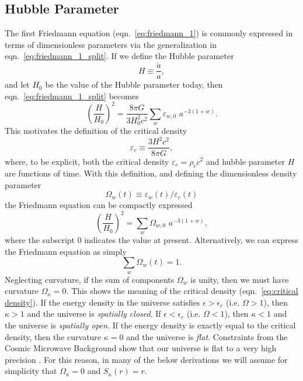 \subsection{Hubble Parameter}
\label{sec:hubble_parameter}
The first Friedmann equation (eqn.~\ref{eq:friedmann_1}) is commonly expressed
in terms of dimensionless parameters via the generalization in
eqn.~\ref{eq:friedmann_1_split}.  If we define the Hubble parameter
\begin{equation}
  \label{eq:hubble_parameter}
  H \equiv \frac{\dot{a}}{a},
\end{equation}
and let $H_0$ be the value of the Hubble parameter today, then
eqn.~\ref{eq:friedmann_1_split} becomes
\begin{equation}
  \left(\frac{H}{H_0}\right)^2 = \frac{8\pi G}{3H_0^2c^2}
  \sum_w \varepsilon_{w, 0} \,\, a^{-3(1 + w)}.
\end{equation}
This motivates the definition of the critical density
\begin{equation}
  \label{eq:critical_density}
  \varepsilon_c \equiv \frac{3 H^2 c^2}{8\pi G},
\end{equation}
where, to be explicit, both the critical density $\varepsilon_c = \rho_c c^2$
and hubble parameter $H$ are functions of time.  With this definition,
and defining the dimensionless density parameter
\begin{equation}
  \label{eq:density_parameter}
  \Omega_w(t) \equiv \varepsilon_w(t) / \varepsilon_c(t)
\end{equation}
the Friedmann equation can be compactly expressed
\begin{equation}
  \left(\frac{H}{H_0}\right)^2
  = \sum_w \Omega_{w, 0}\,\, a^{-3(1 + w)},
\end{equation}
where the subscript $0$ indicates the value at present.
Alternatively, we can express the Friedmann equation as simply
\begin{equation}
  \sum_w \Omega_w(t) = 1.
\end{equation}
Neglecting curvature, if the sum of components $\Omega_w$ is unity, then
we must have curvature $\Omega_\kappa = 0$.  This shows the meaning of
the critical density (eqn.~\ref{eq:critical density}).  If the energy density
in the universe satisfies $\epsilon > \epsilon_c$ (i.e. $\Omega > 1$), then
$\kappa > 1$ and the universe is {\it spatially closed}.
If $\epsilon < \epsilon_c$ (i.e. $\Omega < 1$), then $\kappa < 1$ and
the universe is {\it spatially open}. If the energy density is
exactly equal to the critical density, then the curvature $\kappa = 0$
and the universe is {\it flat}.  Constraints from the Cosmic Microwave
Background show that our universe is flat to a very high precision
\citep{WMAP7}.  For this reason, in many of the below derivations we will
assume for simplicity that $\Omega_\kappa = 0$ and $S_\kappa(r) = r$.

